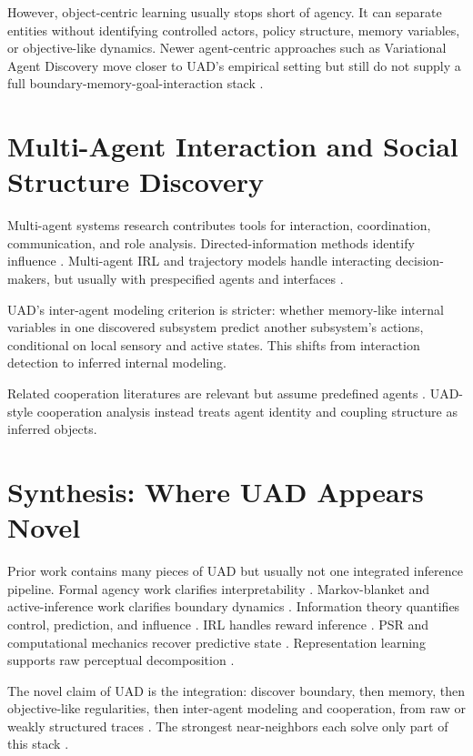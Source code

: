 \documentclass[11pt]{article}
\begin{document}
However, object-centric learning usually stops short of agency. It can separate entities without identifying controlled actors, policy structure, memory variables, or objective-like dynamics. Newer agent-centric approaches such as Variational Agent Discovery move closer to UAD's empirical setting but still do not supply a full boundary-memory-goal-interaction stack \cite{variationalagent2025}.

\section{Multi-Agent Interaction and Social Structure Discovery}

Multi-agent systems research contributes tools for interaction, coordination, communication, and role analysis. Directed-information methods identify influence \cite{schreiber2000te,barnett2009gc,lizier2010transfer}. Multi-agent IRL and trajectory models handle interacting decision-makers, but usually with prespecified agents and interfaces \cite{arora2021survey}.

UAD's inter-agent modeling criterion is stricter: whether memory-like internal variables in one discovered subsystem predict another subsystem's actions, conditional on local sensory and active states. This shifts from interaction detection to inferred internal modeling.

Related cooperation literatures are relevant but assume predefined agents \cite{hamilton1964genetical,woolley2010collective}. UAD-style cooperation analysis instead treats agent identity and coupling structure as inferred objects.

\section{Synthesis: Where UAD Appears Novel}

Prior work contains many pieces of UAD but usually not one integrated inference pipeline. Formal agency work clarifies interpretability \cite{dennett1981true,orseau2018agents,biehl2022pomdp}. Markov-blanket and active-inference work clarifies boundary dynamics \cite{friston2010free,kirchhoff2018markov,parr2020markov,dacosta2021bayesianmechanics}. Information theory quantifies control, prediction, and influence \cite{klyubin2005empowerment,bialek2001predictability,schreiber2000te}. IRL handles reward inference \cite{ng2000irl,ziebart2008maxent}. PSR and computational mechanics recover predictive state \cite{littman2001psr,shalizi2001computational}. Representation learning supports raw perceptual decomposition \cite{locatello2020slot,kipf2020contrastive,goyal2021rim}.

The novel claim of UAD is the integration: discover boundary, then memory, then objective-like regularities, then inter-agent modeling and cooperation, from raw or weakly structured traces \cite{zarncke2025uad,zarncke2025biq}. The strongest near-neighbors each solve only part of this stack \cite{kenton2022discovering,biehl2022pomdp,rosas2020emergence,beck2025dynamic}.



\end{document}
